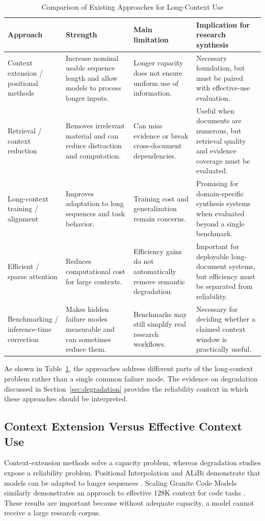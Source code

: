 \documentclass[manuscript,screen,oneside]{acmart}
\begin{document}
\begin{table}[t]
\centering
\caption{Comparison of Existing Approaches for Long-Context Use}
\label{tab:approaches}
\small
\begin{tabularx}{\textwidth}{>{\raggedright\arraybackslash}p{} X X X}
\toprule
\textbf{Approach} & \textbf{Strength} & \textbf{Main limitation} & \textbf{Implication for research synthesis}\\
\midrule
Context extension / positional methods & Increase nominal usable sequence length and allow models to process longer inputs. & Longer capacity does not ensure uniform use of information. & Necessary foundation, but must be paired with effective-use evaluation.\\
Retrieval / context reduction & Removes irrelevant material and can reduce distraction and computation. & Can miss evidence or break cross-document dependencies. & Useful when documents are numerous, but retrieval quality and evidence coverage must be evaluated.\\
Long-context training / alignment & Improves adaptation to long sequences and task behavior. & Training cost and generalization remain concerns. & Promising for domain-specific synthesis systems when evaluated beyond a single benchmark.\\
Efficient / sparse attention & Reduces computational cost for large contexts. & Efficiency gains do not automatically remove semantic degradation. & Important for deployable long-document systems, but efficiency must be separated from reliability.\\
Benchmarking / inference-time correction & Makes hidden failure modes measurable and can sometimes reduce them. & Benchmarks may still simplify real research workflows. & Necessary for deciding whether a claimed context window is practically useful.\\
\bottomrule
\end{tabularx}
\end{table}

As shown in Table~\ref{tab:approaches}, the approaches address different parts of the long-context problem rather than a single common failure mode. The evidence on degradation discussed in Section~\ref{sec:degradation} provides the reliability context in which these approaches should be interpreted.

\subsection{Context Extension Versus Effective Context Use}\label{sec:context-comparison}
Context-extension methods solve a capacity problem, whereas degradation studies expose a reliability problem. Positional Interpolation and ALiBi demonstrate that models can be adapted to longer sequences \cite{press2022train,chen2023extending}. Scaling Granite Code Models similarly demonstrates an approach to effective 128K context for code tasks \cite{stallone2024granite}. These results are important because without adequate capacity, a model cannot receive a large research corpus.
\end{document}
